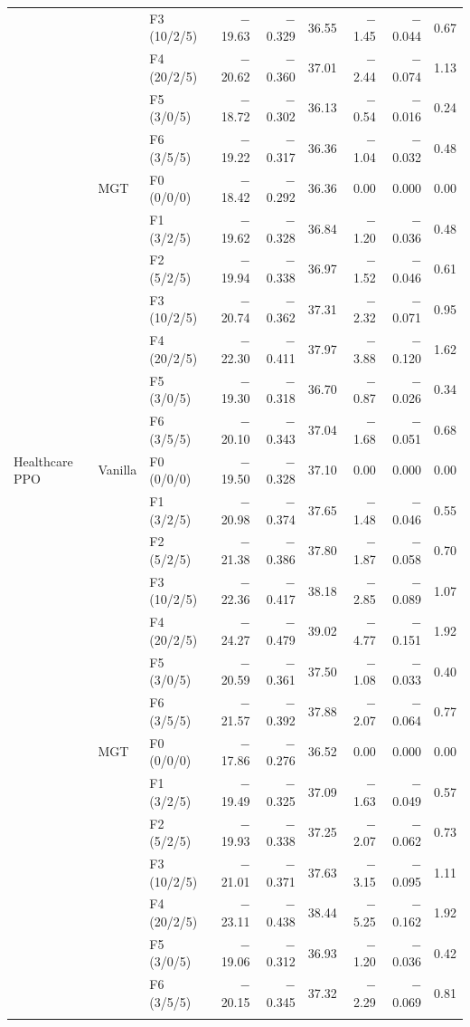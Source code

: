 \begin{table}[!t]
{\begin{tabular}{lllrrrrrr}
 &  & F3 (10/2/5) & $-$19.63 & $-$0.329 & 36.55 & $-$1.45 & $-$0.044 & 0.67 \\
 &  & F4 (20/2/5) & $-$20.62 & $-$0.360 & 37.01 & $-$2.44 & $-$0.074 & 1.13 \\
 &  & F5 (3/0/5) & $-$18.72 & $-$0.302 & 36.13 & $-$0.54 & $-$0.016 & 0.24 \\
 &  & F6 (3/5/5) & $-$19.22 & $-$0.317 & 36.36 & $-$1.04 & $-$0.032 & 0.48 \\
\addlinespace
 & MGT & F0 (0/0/0) & $-$18.42 & $-$0.292 & 36.36 & 0.00 & 0.000 & 0.00 \\
 &  & F1 (3/2/5) & $-$19.62 & $-$0.328 & 36.84 & $-$1.20 & $-$0.036 & 0.48 \\
 &  & F2 (5/2/5) & $-$19.94 & $-$0.338 & 36.97 & $-$1.52 & $-$0.046 & 0.61 \\
 &  & F3 (10/2/5) & $-$20.74 & $-$0.362 & 37.31 & $-$2.32 & $-$0.071 & 0.95 \\
 &  & F4 (20/2/5) & $-$22.30 & $-$0.411 & 37.97 & $-$3.88 & $-$0.120 & 1.62 \\
 &  & F5 (3/0/5) & $-$19.30 & $-$0.318 & 36.70 & $-$0.87 & $-$0.026 & 0.34 \\
 &  & F6 (3/5/5) & $-$20.10 & $-$0.343 & 37.04 & $-$1.68 & $-$0.051 & 0.68 \\
\addlinespace
\midrule
Healthcare PPO & Vanilla & F0 (0/0/0) & $-$19.50 & $-$0.328 & 37.10 & 0.00 & 0.000 & 0.00 \\
 &  & F1 (3/2/5) & $-$20.98 & $-$0.374 & 37.65 & $-$1.48 & $-$0.046 & 0.55 \\
 &  & F2 (5/2/5) & $-$21.38 & $-$0.386 & 37.80 & $-$1.87 & $-$0.058 & 0.70 \\
 &  & F3 (10/2/5) & $-$22.36 & $-$0.417 & 38.18 & $-$2.85 & $-$0.089 & 1.07 \\
 &  & F4 (20/2/5) & $-$24.27 & $-$0.479 & 39.02 & $-$4.77 & $-$0.151 & 1.92 \\
 &  & F5 (3/0/5) & $-$20.59 & $-$0.361 & 37.50 & $-$1.08 & $-$0.033 & 0.40 \\
 &  & F6 (3/5/5) & $-$21.57 & $-$0.392 & 37.88 & $-$2.07 & $-$0.064 & 0.77 \\
\addlinespace
 & MGT & F0 (0/0/0) & $-$17.86 & $-$0.276 & 36.52 & 0.00 & 0.000 & 0.00 \\
 &  & F1 (3/2/5) & $-$19.49 & $-$0.325 & 37.09 & $-$1.63 & $-$0.049 & 0.57 \\
 &  & F2 (5/2/5) & $-$19.93 & $-$0.338 & 37.25 & $-$2.07 & $-$0.062 & 0.73 \\
 &  & F3 (10/2/5) & $-$21.01 & $-$0.371 & 37.63 & $-$3.15 & $-$0.095 & 1.11 \\
 &  & F4 (20/2/5) & $-$23.11 & $-$0.438 & 38.44 & $-$5.25 & $-$0.162 & 1.92 \\
 &  & F5 (3/0/5) & $-$19.06 & $-$0.312 & 36.93 & $-$1.20 & $-$0.036 & 0.42 \\
 &  & F6 (3/5/5) & $-$20.15 & $-$0.345 & 37.32 & $-$2.29 & $-$0.069 & 0.81 \\
\addlinespace
\bottomrule
\end{tabular}}\end{table}